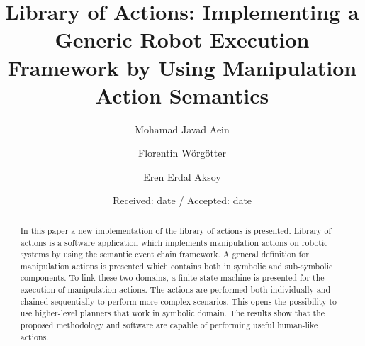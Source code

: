 \title{Library of Actions: Implementing a Generic Robot Execution Framework by Using Manipulation Action Semantics}




\author{  Mohamad Javad Aein      \and  	 Florentin  W\"org\"otter	 \and  Eren Erdal Aksoy  	 }



\date{Received: date / Accepted: date}

\maketitle

\begin{abstract}

In this paper a new implementation of the library of actions is presented.
Library of actions is a software application which implements  manipulation actions on robotic systems by using the semantic event chain framework.
A general definition for manipulation actions is presented which contains both in symbolic and sub-symbolic components.
To link these two domains, a finite state machine is presented for the  execution of manipulation actions.
The actions are performed both individually and chained sequentially to perform more complex scenarios.
This opens the possibility to use higher-level planners that work in symbolic domain.
The results show that the proposed methodology and software are capable of performing useful human-like actions.


 
\end{abstract}


